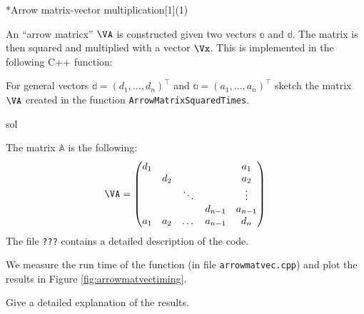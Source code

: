 
\begin{samproblem}*{}{Arrow matrix-vector multiplication}[1](1){
    An ``arrow matricx'' $\VA$ is constructed given two vectors $\mathbb{a}$ and $\mathbb{d}$.
    The matrix is then squared and multiplied with a vector $\Vx$. This is implemented in the
    following C++ function:


}

\begin{subproblem}{}

  For general vectors $\mathbb{d} = (d_1, \dots, d_n)^\top$ and $\mathbb{a} = (a_1, \dots, a_n)^\top$
  sketch the matrix $\VA$ created in the function \verb|ArrowMatrixSquaredTimes|.

  \begin{samwriteprbpart}{sol}
  \begin{samsolution}
    The matrix $\mathbb{A}$ is the following:
    \begin{align}
    \VA=\begin{pmatrix}
      d_1 &     &        &         & a_1     \\
          & d_2 &        &         & a_2     \\
          &     & \ddots &         & \vdots  \\
          &     &        & d_{n-1} & a_{n-1} \\
      a_1 & a_2 & \dots  & a_{n-1} & d_n     \\
    \end{pmatrix}
    \end{align}
    The file \texttt{???} contains a detailed description of the code.
  \end{samsolution}
\end{samwriteprbpart}
\end{subproblem}

\begin{subproblem}
  We measure the run time of the function \texttt{} (in file \texttt{arrowmatvec.cpp})
  and plot the results in Figure \ref{fig:arrowmatvectiming}.

  Give a detailed explanation of the results.



\end{subproblem}
\end{samproblem}
